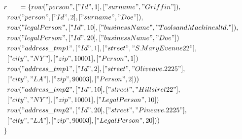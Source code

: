 \documentclass[11pt]{article}
\begin{document}
\begin{align*}
r & \;\;\;\;\;\; =\{ row("person", ["Id", 1], ["surname", "Griffin"]), \\
& row("person", ["Id", 2], ["surname", "Doe"]), \\
& row("legalPerson", ["Id", 10], ["businessName", "Tools and Machines ltd."]), \\
& row("legalPerson", ["Id", 20], ["businessName", "Doe"])\\
& row("address\_tmp1", ["Id", 1], ["street", "S. Mary Evenue 22"], \\ 
& ["city", "NY"], ["zip", 10001], ["Person", 1]) \\
& row("address\_tmp1", ["Id", 2], ["street", "Olive ave. 2225"], \\
& ["city", "LA"], ["zip", 90003], ["Person", 2]) )\\
& row("address\_tmp2", ["Id", 10], ["street", "Hill stret 22"], \\
& ["city", "NY"], ["zip", 10001], ["LegalPerson", 10]) \\
& row("address\_tmp2", ["Id", 20], ["street", "Pine ave. 2225"], \\
& ["city", "LA"], ["zip", 90003], ["LegalPerson", 20]) )\\
\}
\end{align*}
\end{document}
